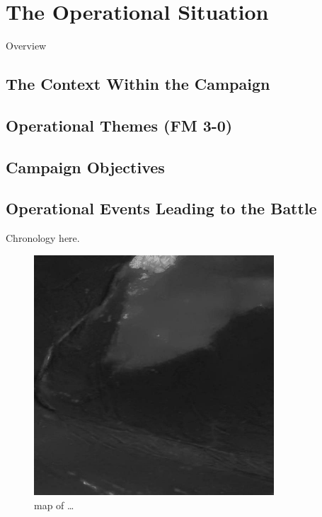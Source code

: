 \section{The Operational Situation}

Overview

\subsection{The Context Within the Campaign}

\subsection{Operational Themes (FM 3-0)}

\subsection{Campaign Objectives}

\subsection{Operational Events Leading to the Battle}

Chronology here.

\begin{figure}[h!]
\centering
\includegraphics[width=0.8\textwidth]{gfx/map1}
\caption{map of \ldots}
\end{figure}




